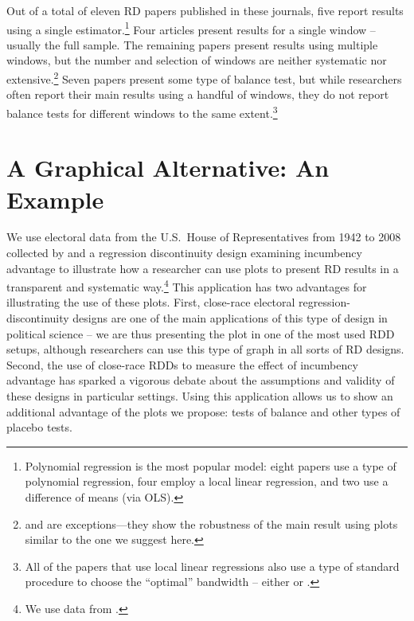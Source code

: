 \documentclass[letterpaper,twoside,12pt]{article}
\begin{document}
Out of a total of eleven RD papers published in these journals, five report results using a single estimator.\footnote{Polynomial regression is the most popular model:  eight papers use a type of polynomial regression, four employ a local linear regression, and two use a difference of means (via OLS).} Four articles present results for a single window -- usually the full sample. The remaining papers present results using multiple windows, but the number and selection of windows are neither systematic nor extensive.\footnote{\citet{gerber2011mayors} and \citet{ferwerda2014devolution} are exceptions---they show the robustness of the main result using plots similar to the one we suggest here.} Seven papers present some type of balance test, but while researchers often report their main results using a handful of windows, they do not report balance tests for different windows to the same extent.\footnote{All of the papers that use local linear regressions also use a type of standard procedure to choose the ``optimal'' bandwidth -- either \citet{imbens2008regression} or \citet{imbens2011optimal}.}

\section{A Graphical Alternative: An Example}

We use electoral data from the U.S.\ House of Representatives from 1942 to 2008 collected by \citet{caughey2011elections} and a regression discontinuity design examining incumbency advantage to illustrate how a researcher can use plots to present RD results in a transparent and systematic way.\footnote{We use data from \citet{caugheysekhondata}.} This application has two advantages for illustrating the use of these plots. First, close-race electoral regression-discontinuity designs are one of the main applications of this type of design in political science -- we are thus presenting the plot in one of the most used RDD setups, although researchers can use this type of graph in all sorts of RD designs. Second, the use of close-race RDDs to measure the effect of incumbency advantage has sparked a vigorous debate about the assumptions and validity of these designs in particular settings. Using this application allows us to show an additional advantage of the plots we propose: tests of balance and other types of placebo tests.
\end{document}
